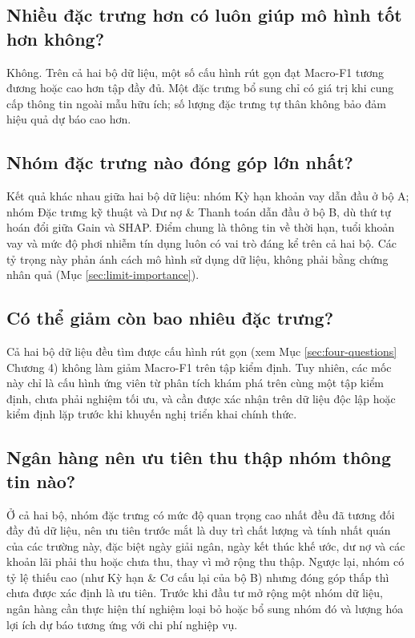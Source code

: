 \subsection{Nhiều đặc trưng hơn có luôn giúp mô hình tốt hơn không?}

Không. Trên cả hai bộ dữ liệu, một số cấu hình rút gọn đạt Macro-F1 tương đương hoặc cao hơn tập đầy đủ. Một đặc trưng bổ sung chỉ có giá trị khi cung cấp thông tin ngoài mẫu hữu ích; số lượng đặc trưng tự thân không bảo đảm hiệu quả dự báo cao hơn.

\subsection{Nhóm đặc trưng nào đóng góp lớn nhất?}

Kết quả khác nhau giữa hai bộ dữ liệu: nhóm Kỳ hạn khoản vay dẫn đầu ở bộ A; nhóm Đặc trưng kỹ thuật và Dư nợ \& Thanh toán dẫn đầu ở bộ B, dù thứ tự hoán đổi giữa Gain và SHAP. Điểm chung là thông tin về thời hạn, tuổi khoản vay và mức độ phơi nhiễm tín dụng luôn có vai trò đáng kể trên cả hai bộ. Các tỷ trọng này phản ánh cách mô hình sử dụng dữ liệu, không phải bằng chứng nhân quả (Mục \ref{sec:limit-importance}).

\subsection{Có thể giảm còn bao nhiêu đặc trưng?}

Cả hai bộ dữ liệu đều tìm được cấu hình rút gọn (xem Mục \ref{sec:four-questions} Chương 4) không làm giảm Macro-F1 trên tập kiểm định. Tuy nhiên, các mốc này chỉ là cấu hình ứng viên từ phân tích khám phá trên cùng một tập kiểm định, chưa phải nghiệm tối ưu, và cần được xác nhận trên dữ liệu độc lập hoặc kiểm định lặp trước khi khuyến nghị triển khai chính thức.

\subsection{Ngân hàng nên ưu tiên thu thập nhóm thông tin nào?}

Ở cả hai bộ, nhóm đặc trưng có mức độ quan trọng cao nhất đều đã tương đối đầy đủ dữ liệu, nên ưu tiên trước mắt là duy trì chất lượng và tính nhất quán của các trường này, đặc biệt ngày giải ngân, ngày kết thúc khế ước, dư nợ và các khoản lãi phải thu hoặc chưa thu, thay vì mở rộng thu thập. Ngược lại, nhóm có tỷ lệ thiếu cao (như Kỳ hạn \& Cơ cấu lại của bộ B) nhưng đóng góp thấp thì chưa được xác định là ưu tiên. Trước khi đầu tư mở rộng một nhóm dữ liệu, ngân hàng cần thực hiện thí nghiệm loại bỏ hoặc bổ sung nhóm đó và lượng hóa lợi ích dự báo tương ứng với chi phí nghiệp vụ.


